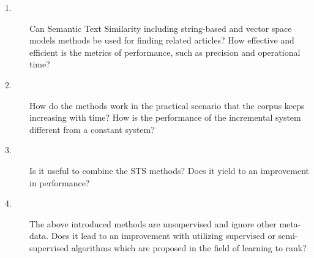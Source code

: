 \begin{description}
    \item[1.] \label{q:1} Can Semantic Text Similarity including string-based and vector space models methods be used for finding related articles? How effective and efficient is the metrics of performance, such as precision and operational time?
    \item[2.] \label{q:2} How do the methods work in the practical scenario that the corpus keeps increasing with time? How is the performance of the incremental system different from a constant system? 
    \item[3.] \label{q:3} Is it useful to combine the STS methods? Does it yield to an improvement in performance?
    \item[4.] \label{q:4} The above introduced methods are unsupervised and ignore other meta-data. Does it lead to an improvement with utilizing supervised or semi-supervised algorithms which are proposed in the field of learning to rank?
\end{description}